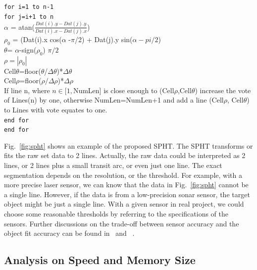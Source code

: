 \documentclass{cdcarta4}
\begin{document}
{\footnotesize
\texttt{for i=1 to n-1}\\
\hspace*{4mm}    \texttt{for j=i+1 to n} \\
\hspace*{8mm}                $\alpha$ = atan($\frac{ Dat(i).y- Dat(j).y}{Dat(i).x - Dat(j).x} $)\\
\hspace*{8mm}                $\rho_0$ = (Dat(i).x cos($\alpha$ -$\pi$/2) + Dat(j).y sin($\alpha-pi/2$)\\
\hspace*{8mm}                $\theta$= $\alpha$-sign($\rho_0$) $\pi/2$ \\
\hspace*{8mm}                $\rho=|\rho_0|$ \\
\hspace*{8mm}                Cell$\theta$=floor($\theta$/$\Delta\theta$)*$\Delta\theta$ \\
\hspace*{8mm}                Cell$\rho$=floor($\rho/\Delta\rho$)*$\Delta\rho$ \\
\hspace*{8mm}                If line n, where $n\in[1,$NumLen]  is close enough to (Cell$\rho$,Cell$\theta$) increase the vote of Lines(n) by one, otherwise NumLen=NumLen+1 and add a line (Cell$\rho$, Cell$\theta$) to Lines with vote equates to one.  \\
\hspace*{4mm}    \texttt{end for} \\
\texttt{end for}
}
    
Fig.~\ref{fig:spht} shows an example of the proposed SPHT. The SPHT transforms or fits  the raw set data to 2 lines. 
Actually,  the raw data could be interpreted as 2 lines,  or 2 lines plus a small transit arc, or even just one line. The exact segmentation depends on the resolution, or the threshold. For example, with a  more precise laser sensor, we can know  that the data in Fig.~\ref{fig:spht} cannot be a single line. However, if  the data is from a low-precision sonar sensor, the target object might be just a single line. With a given sensor in real project, we could choose some reasonable thresholds by referring to the specifications of the sensors. Further discussions on the trade-off between sensor accuracy and the object fit accuracy can be found in~\cite{Goto98Efficient} and ~\cite{Goto00Design}.


\subsection{Analysis on Speed and Memory Size}
\label{sec23}
\end{document}
